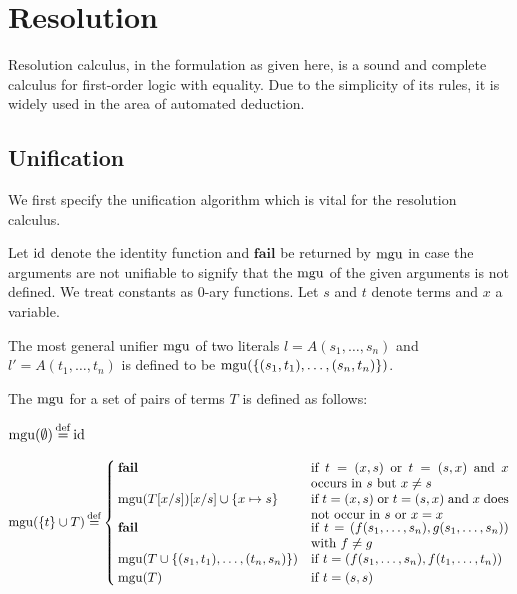 

\section{Resolution}
\label{sec:resolution}

Resolution calculus, in the formulation as given here, is a sound and complete calculus for first-order logic with equality.
Due to the simplicity of its rules, it is widely used in the area of automated deduction.

\subsection{Unification}

We first specify the unification algorithm which is vital for the resolution calculus.

Let $\operatorname{id}$ denote the identity function and $\textbf{fail}$ be returned by $\operatorname{mgu}$ in case the arguments are not unifiable to signify that the $\operatorname{mgu}$ of the given arguments is not defined. We treat constants as $0$-ary functions.
Let $s$ and $t$ denote terms and $x$ a variable.

\begin{defi}

The most general unifier $\operatorname{mgu}$ of two literals $l = A(s_1,\dotsc, s_n)$ and $l' = A(t_1,\dots, t_n)$ is defined to be $\operatorname{mgu}(\{ (s_1, t_1), \dotsc, (s_n, t_n)\})$.


The $\operatorname{mgu}$ for a set of pairs of terms $T$ is defined as follows:
\medskip

\begin{adjustwidth}{-1.85em}{0em}
\noindent
$
\mgu(\emptyset) \defeq \id
$\nopagebreak

\newcommand{\aatahfdgasdfg}{.44\textwidth}
\noindent
$
\mbox{$\mgu(\{t\} \cup T)$} \defeq
\begin{cases}
	\mathbf{fail} 				& \parbox[t]{\aatahfdgasdfg}{if $t = (x, s)$ or $t=(s,x)$ and $x$ occurs in $s$ but $x\neq s$ } \\
	\mgu(T\subst{x/s})\subst{x/s} \cup \{x\mapsto s\} 		& \parbox[t]{\aatahfdgasdfg}{if $t = (x, s)$ or $t=(s,x)$ and $x$ does not occur in $s$ or $x=x$} \\
	\mathbf{fail} 				& \parbox[t]{\aatahfdgasdfg}{if $t = (f(s_1,\dotsc,s_n), g(s_1,\dotsc,s_n))$ with $f\neq g$} \\
	\mgu(T \cup \{(s_1, t_1), \dotsc, (t_n, s_n)\})		& \parbox[t]{\aatahfdgasdfg}{if $t = (f(s_1,\dotsc,s_n), f(t_1,\dotsc,t_n))$} \\
	\mgu(T) 							& \text{if $t=(s, s)$} \\
\end{cases}
$
\end{adjustwidth}
\end{defi}

